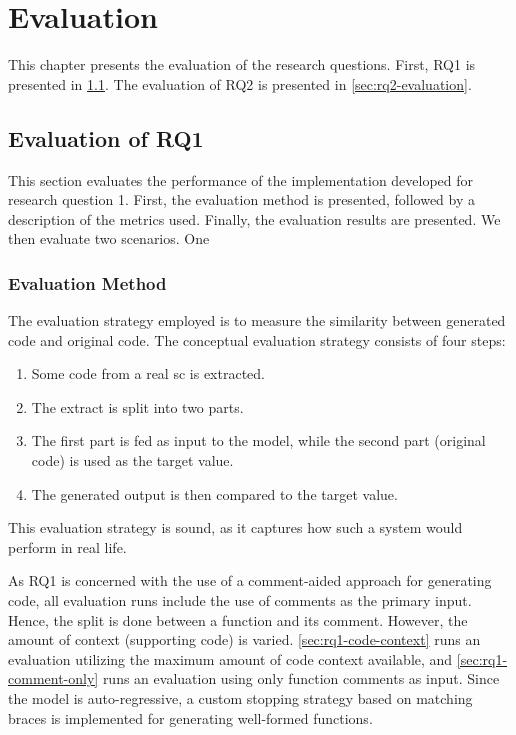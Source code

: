
\chapter{Evaluation}
\label{chap:evaluation}
This chapter presents the evaluation of the research questions. First, RQ1 is presented in \cref{sec:rq1-evaluation}. The evaluation of RQ2 is presented in \cref{sec:rq2-evaluation}.

\section{Evaluation of RQ1}
\label{sec:rq1-evaluation}
This section evaluates the performance of the implementation developed for research question 1. First, the evaluation method is presented, followed by a description of the metrics used. Finally, the evaluation results are presented.  We then evaluate two scenarios. One 

\subsection{Evaluation Method}
\label{sec:rq1-evaluation-method}
The evaluation strategy employed is to measure the similarity between generated code and original code. The conceptual evaluation strategy consists of four steps:
\begin{enumerate}
    \item Some code from a real \acrshort{sc} is extracted.
    \item The extract is split into two parts.
    \item The first part is fed as input to the model, while the second part (original code) is used as the target value.
    \item The generated output is then compared to the target value.
\end{enumerate}
This evaluation strategy is sound, as it captures how such a system would perform in real life. 

As RQ1 is concerned with the use of a comment-aided approach for generating code, all evaluation runs include the use of comments as the primary input. Hence, the split is done between a function and its comment. However, the amount of context (supporting code) is varied. \cref{sec:rq1-code-context} runs an evaluation utilizing the maximum amount of code context available, and \cref{sec:rq1-comment-only} runs an evaluation using only function comments as input. Since the model is auto-regressive, a custom stopping strategy based on matching braces is implemented for generating well-formed functions.

